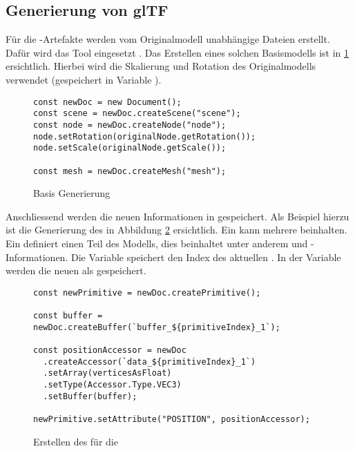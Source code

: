 \subsection{Generierung von glTF}

Für die -Artefakte werden vom Originalmodell unabhängige  Dateien erstellt. Dafür wird das Tool  eingesetzt \cite{gltfTransform}.
Das Erstellen eines solchen Basismodells ist in \ref{code:gltfTransform} ersichtlich. Hierbei wird die Skalierung und Rotation des Originalmodells verwendet (gespeichert in Variable ).

\begin{figure}[H]
  \begin{lstlisting}[style=JavaScript]
const newDoc = new Document();
const scene = newDoc.createScene("scene");
const node = newDoc.createNode("node");
node.setRotation(originalNode.getRotation());
node.setScale(originalNode.getScale());

const mesh = newDoc.createMesh("mesh");
  \end{lstlisting}
  \caption{Basis  Generierung}
  \label{code:gltfTransform}
\end{figure}

\pagebreak

Anschliessend werden die neuen Informationen in  gespeichert. Als Beispiel hierzu ist die Generierung des  in Abbildung \ref{code:bufferCreation} ersichtlich. Ein  kann mehrere  beinhalten. Ein  definiert einen Teil des Modells, dies beinhaltet unter anderem  und -Informationen. Die Variable  speichert den Index des aktuellen . In der Variable  werden die neuen  als  gespeichert.

\begin{figure}[H]
  \begin{lstlisting}[style=JavaScript]
const newPrimitive = newDoc.createPrimitive();

const buffer = newDoc.createBuffer(`buffer_${primitiveIndex}_1`);

const positionAccessor = newDoc
  .createAccessor(`data_${primitiveIndex}_1`)
  .setArray(verticesAsFloat)
  .setType(Accessor.Type.VEC3)
  .setBuffer(buffer);

newPrimitive.setAttribute("POSITION", positionAccessor);
  \end{lstlisting}
  \caption{Erstellen des  für die }
  \label{code:bufferCreation}
\end{figure}


